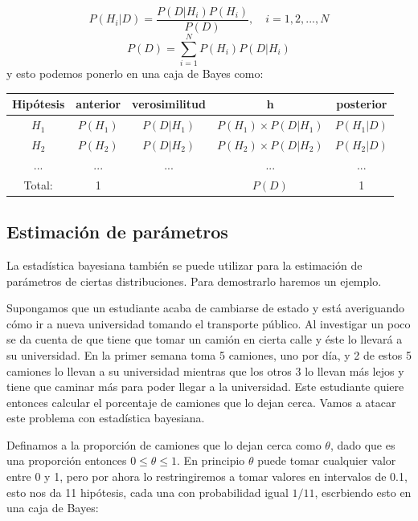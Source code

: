 \documentclass{article}
\begin{document}
\begin{equation}
P(H_i \vert D)=\frac{P(D\vert H_i)P(H_i)}{P(D)},\quad i=1,2,..., N
\end{equation}
\begin{equation}
P(D)= \sum_{i=1}^{N} P(H_i)P(D\vert H_i)
\end{equation}
y esto podemos ponerlo en una caja de Bayes como:

\begin{center}
\begin{tabular}{ |c|c|c|c|c| } 
\hline
Hip\'otesis & anterior & verosimilitud &  h  & posterior \\
\hline
$H_1$ & $P(H_1)$ & $P(D\vert H_1)$ & $P(H_1)\times P(D\vert H_1)$ & $P(H_1\vert D)$ \\
$H_2$ & $P(H_2)$ & $P(D\vert H_2)$ & $P(H_2)\times P(D\vert H_2)$ & $P(H_2\vert D)$ \\
... & ... & ... & ... & ... \\
\hline
Total: & 1 &  & $P(D)$ & 1 \\
\hline
\end{tabular}
\end{center}

\subsection*{Estimaci\'on de par\'ametros}

La estad\'istica bayesiana tambi\'en se puede utilizar para la estimaci\'on de par\'ametros de ciertas distribuciones. Para demostrarlo haremos un ejemplo.

Supongamos que un estudiante acaba de cambiarse de estado y est\'a averiguando c\'omo ir a nueva universidad tomando el transporte p\'ublico. Al investigar un poco se da cuenta de que tiene que tomar un cami\'on en cierta calle y \'este lo llevar\'a a su universidad. En la primer semana toma 5 camiones, uno por d\'ia, y 2 de estos 5 camiones lo llevan a su universidad mientras que los otros 3 lo llevan m\'as lejos y tiene que caminar m\'as para poder llegar a la universidad. Este estudiante quiere entonces calcular el porcentaje de camiones que lo dejan cerca. Vamos a atacar este problema con estad\'istica bayesiana.

Definamos a la proporci\'on de camiones que lo dejan cerca como $\theta$, dado que es una proporci\'on entonces $0\leq \theta \leq 1$. En principio $\theta$ puede tomar cualquier valor entre 0 y 1, pero por ahora lo restringiremos a tomar valores en intervalos de 0.1, esto nos da 11 hip\'otesis, cada una con probabilidad igual $1/11$, escrbiendo esto en una caja de Bayes:
\end{document}
